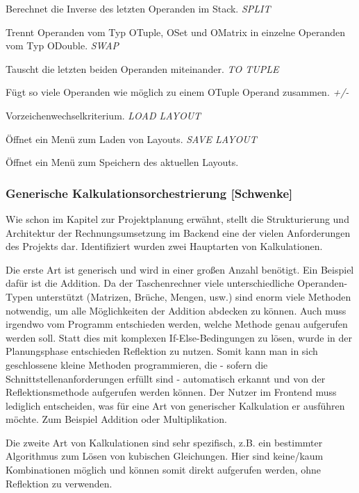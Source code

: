 Berechnet die Inverse des letzten Operanden im Stack.
\textit{SPLIT}

Trennt Operanden vom Typ OTuple, OSet und OMatrix in einzelne Operanden vom Typ ODouble.
\textit{SWAP}

Tauscht die letzten beiden Operanden miteinander.
\textit{TO TUPLE}

Fügt so viele Operanden wie möglich zu einem OTuple Operand zusammen.
\textit{+/-}

Vorzeichenwechselkriterium.
\textit{LOAD LAYOUT}

Öffnet ein Menü zum Laden von Layouts.
\textit{SAVE LAYOUT}

Öffnet ein Menü zum Speichern des aktuellen Layouts.


\subsubsection{Generische Kalkulationsorchestrierung [Schwenke]}

Wie schon im Kapitel zur Projektplanung erwähnt, stellt die Strukturierung und Architektur der Rechnungsumsetzung im Backend eine der vielen Anforderungen des Projekts dar. Identifiziert wurden zwei Hauptarten von Kalkulationen. 

Die erste Art ist generisch und wird in einer großen Anzahl benötigt. Ein Beispiel dafür ist die Addition. Da der Taschenrechner viele unterschiedliche Operanden-Typen unterstützt (Matrizen, Brüche, Mengen, usw.) sind enorm viele Methoden notwendig, um alle Möglichkeiten der Addition abdecken zu können. Auch muss irgendwo vom Programm entschieden werden, welche Methode genau aufgerufen werden soll. Statt dies mit komplexen If-Else-Bedingungen zu lösen, wurde in der Planungsphase entschieden Reflektion zu nutzen. Somit kann man in sich geschlossene kleine Methoden programmieren, die - sofern die Schnittstellenanforderungen erfüllt sind - automatisch erkannt und von der Reflektionsmethode aufgerufen werden können. Der Nutzer im Frontend muss lediglich entscheiden, was für eine Art von generischer Kalkulation er ausführen möchte. Zum Beispiel Addition oder Multiplikation. 

Die zweite Art von Kalkulationen sind sehr spezifisch, z.B. ein bestimmter Algorithmus zum Lösen von kubischen Gleichungen. Hier sind keine/kaum Kombinationen möglich und können somit direkt aufgerufen werden, ohne Reflektion zu verwenden.

